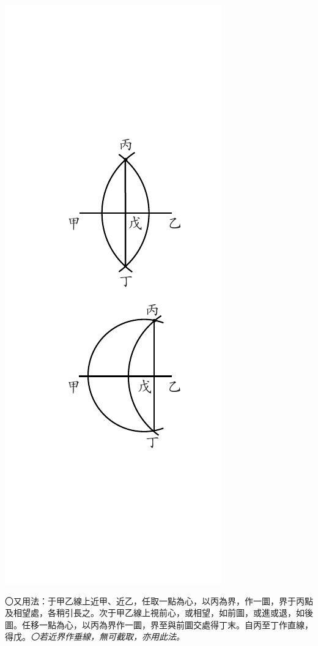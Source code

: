 \documentclass[12pt,b5paper,landscape]{article}
\newcommand{\ccom}[1]{{\footnotesize \emph{〇#1}}}
\newcommand{\bcom}[1]{〇#1}
\begin{document}
\begin{multicols}{2}
\begin{center}
\includegraphics[angle=90]{eu57}
\end{center}
\bcom{又用法：于甲乙線上近甲、近乙，任取一點為心，以丙為界，作一圜，界于丙點及相望處，各稍引長之。次于甲乙線上視前心，或相望，如前圖，或進或退，如後圖。任移一點為心，以丙為界作一圜，界至與前圜交處得丁末。自丙至丁作直線，得戊。\ccom{若近界作垂線，無可截取，亦用此法。}}


\end{multicols}
\end{document}
